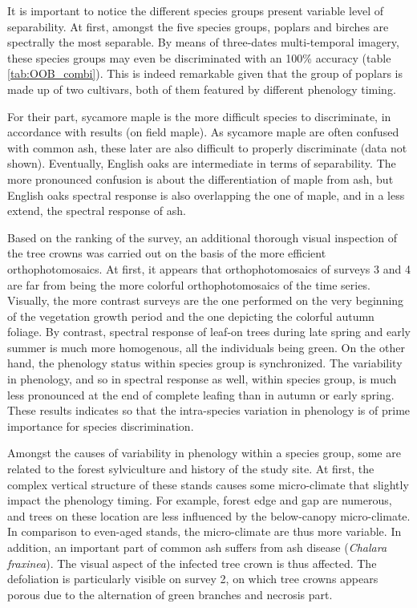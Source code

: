 \documentclass[remotesensing,article,submit,moreauthors,pdftex,12pt,a4paper]{mdpi} %
\begin{document}
It is important to notice the different species groups present variable level of separability. 
At first, amongst the five species groups, poplars and birches are spectrally the most separable. 
By means of three-dates multi-temporal imagery, these species groups may even be discriminated with an 100\% accuracy (table \ref{tab:OOB_combi}). 
This is indeed remarkable given that the group of poplars is made up of two cultivars, both of them featured by different phenology timing. 

For their part, sycamore maple is the more difficult species to discriminate, in accordance with \citeauthor{hill_mapping_2010} \cite{hill_mapping_2010} results (on field maple). 
As sycamore maple are often confused with common ash, these later are also difficult to properly discriminate (data not shown). 
Eventually, English oaks are intermediate in terms of separability. 
The more pronounced confusion is about the differentiation of maple from ash, but English oaks spectral response is also overlapping the one of maple, and in a less extend, the spectral response of ash. 

Based on the ranking of the survey, an additional thorough visual inspection of the tree crowns was carried out on the basis of the more efficient orthophotomosaics. 
At first, it appears that orthophotomosaics of surveys 3 and 4 are far from being the more colorful orthophotomosaics of the time series. 
Visually, the more contrast surveys are the one performed on the very beginning of the vegetation growth period and the one depicting the colorful autumn foliage. 
By contrast, spectral response of leaf-on trees during late spring and early summer is much more homogenous, all the individuals being green. 
On the other hand, the phenology status within species group is synchronized. 
The variability in phenology, and so in spectral response as well, within species group, is much less pronounced at the end of complete leafing than in autumn or early spring. 
These results indicates so that the intra-species variation in phenology is of prime importance for species discrimination.

Amongst the causes of variability in phenology within a species group, some are related to the forest sylviculture and history of the study site. 
At first, the complex vertical structure of these stands causes some micro-climate that slightly impact the phenology timing. 
For example, forest edge and gap are numerous, and trees on these location are less influenced by the below-canopy micro-climate. 
In comparison to even-aged stands, the micro-climate are thus more variable. 
In addition, an important part of common ash suffers from ash disease (\textit{Chalara fraxinea}). 
The visual aspect of the infected tree crown is thus affected. 
The defoliation is particularly visible on survey 2, on which tree crowns appears porous due to the alternation of green branches and necrosis part. 
\end{document}
